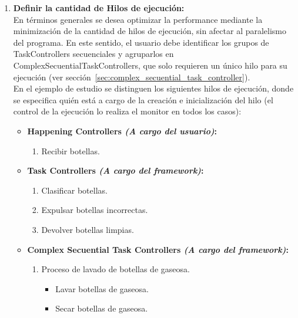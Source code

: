 \begin{enumerate}
\item \textbf{Definir la cantidad de Hilos de ejecución:}\\
            En términos generales se desea optimizar la performance mediante la
            minimización de la cantidad de hilos de ejecución, sin
            afectar al paralelismo del programa. En este sentido, el usuario
            debe identificar los grupos de TaskControllers secuenciales y
            agruparlos en ComplexSecuentialTaskControllers, que solo requieren
            un único hilo para su ejecución (ver
            sección~\ref{sec:complex_secuential_task_controller}). \\
            En el ejemplo de estudio se distinguen los siguientes hilos de
            ejecución, donde se especifica quién está a cargo de la creación e
            inicialización del hilo (el control de la ejecución lo realiza el
            monitor en todos los casos):
            \begin{itemize}
              \item \textbf{Happening Controllers \emph{(A cargo del usuario)}:}
                  \begin{enumerate}[label=\fbox{\arabic*}]
                    \item Recibir botellas. 
                  \end{enumerate}
              \item \textbf{Task Controllers \emph{(A cargo del framework)}:}
                  \begin{enumerate}[resume , label=\fbox{\arabic*}]
                  \item Clasificar botellas.
                  \item Expulsar botellas incorrectas.
                  \item Devolver botellas limpias.
                  \end{enumerate}
              \item \textbf{Complex Secuential Task Controllers \emph{(A cargo
              del framework)}:} \begin{enumerate}[resume, label=\fbox{\arabic*}]
                    \item Proceso de lavado de botellas de gaseosa.
                        \begin{itemize}
                          \item Lavar botellas de gaseosa.
                          \item Secar botellas de gaseosa.
                      \end{itemize}

\end{enumerate}
\end{itemize}
\end{enumerate}
